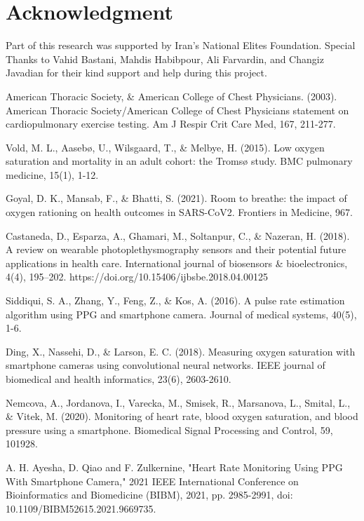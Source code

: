 \documentclass[conference]{IEEEtran}
\begin{document}
\section*{Acknowledgment}
Part of this research was supported by Iran's National Elites Foundation. Special Thanks to Vahid Bastani, Mahdis Habibpour, Ali Farvardin, and Changiz Javadian for their kind support and help during this project.

\begin{thebibliography}{00}

 American Thoracic Society, \& American College of Chest Physicians. (2003). American Thoracic Society/American College of Chest Physicians statement on cardiopulmonary exercise testing. Am J Respir Crit Care Med, 167, 211-277.

 Vold, M. L., Aasebø, U., Wilsgaard, T., \& Melbye, H. (2015). Low oxygen saturation and mortality in an adult cohort: the Tromsø study. BMC pulmonary medicine, 15(1), 1-12.

 Goyal, D. K., Mansab, F., \& Bhatti, S. (2021). Room to breathe: the impact of oxygen rationing on health outcomes in SARS-CoV2. Frontiers in Medicine, 967.

 Castaneda, D., Esparza, A., Ghamari, M., Soltanpur, C., \& Nazeran, H. (2018). A review on wearable photoplethysmography sensors and their potential future applications in health care. International journal of biosensors \& bioelectronics, 4(4), 195–202. https://doi.org/10.15406/ijbsbe.2018.04.00125

 Siddiqui, S. A., Zhang, Y., Feng, Z., \& Kos, A. (2016). A pulse rate estimation algorithm using PPG and smartphone camera. Journal of medical systems, 40(5), 1-6.

 Ding, X., Nassehi, D., \& Larson, E. C. (2018). Measuring oxygen saturation with smartphone cameras using convolutional neural networks. IEEE journal of biomedical and health informatics, 23(6), 2603-2610.

 Nemcova, A., Jordanova, I., Varecka, M., Smisek, R., Marsanova, L., Smital, L., \& Vitek, M. (2020). Monitoring of heart rate, blood oxygen saturation, and blood pressure using a smartphone. Biomedical Signal Processing and Control, 59, 101928.

A. H. Ayesha, D. Qiao and F. Zulkernine, "Heart Rate Monitoring Using PPG With Smartphone Camera," 2021 IEEE International Conference on Bioinformatics and Biomedicine (BIBM), 2021, pp. 2985-2991, doi: 10.1109/BIBM52615.2021.9669735.


\end{thebibliography}
\end{document}
